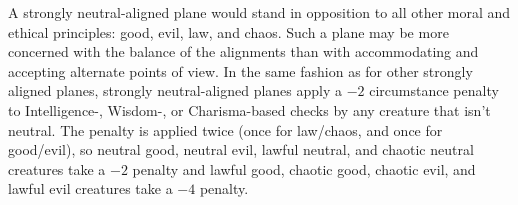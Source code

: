 A strongly neutral-aligned plane would stand in opposition to all other moral and ethical principles: good, evil, law, and chaos. Such a plane may be more concerned with the balance of the alignments than with accommodating and accepting alternate points of view. In the same fashion as for other strongly aligned planes, strongly neutral-aligned planes apply a $-2$ circumstance penalty to Intelligence-, Wisdom-, or Charisma-based checks by any creature that isn't neutral. The penalty is applied twice (once for law/chaos, and once for good/evil), so neutral good, neutral evil, lawful neutral, and chaotic neutral creatures take a $-2$ penalty and lawful good, chaotic good, chaotic evil, and lawful evil creatures take a $-4$ penalty.